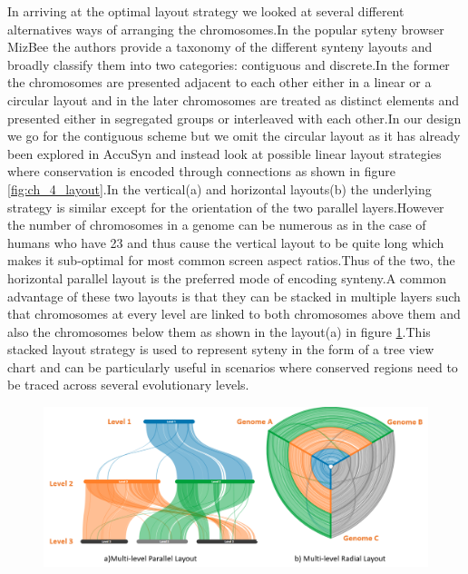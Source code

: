 In arriving at the optimal layout strategy we looked at several different alternatives ways of arranging the chromosomes.In the popular syteny browser MizBee\cite{Meyer2009} the authors provide a taxonomy of the different synteny layouts and broadly classify them into two categories: contiguous and discrete.In the former the chromosomes are presented adjacent to each other either in a linear or a circular layout and in the later chromosomes are treated as distinct elements and presented either in segregated groups or interleaved with each other.In our design we go for the contiguous scheme but we omit the circular layout as it has already been explored in AccuSyn\cite{accusyn}  and instead look at possible linear layout strategies where conservation is encoded through connections as shown in figure \ref{fig:ch_4_layout}.In the vertical(a) and horizontal layouts(b) the underlying strategy is similar except for the orientation of the two parallel layers.However the number of chromosomes in a genome can be numerous as in the case of humans who have 23 and thus cause the vertical layout to be quite long which makes it sub-optimal for most common screen aspect ratios.Thus of the two, the horizontal parallel layout is the preferred mode of encoding synteny.A common advantage of these two layouts is that they can be stacked in multiple layers such that chromosomes at every level are linked to both chromosomes above them and also the chromosomes below them as shown in the layout(a) in figure \ref{fig:ch_4_layout_multi}.This stacked layout strategy is used to represent syteny in the form of a tree view chart and can be particularly useful in scenarios where conserved regions need to be traced across several evolutionary levels.

\begin{figure}[ht]
  \centering
  \includegraphics[width=.95\linewidth]{images/ch_4_layout_multi.PNG}
  \label{fig:ch_4_layout_multi}
\end{figure}

